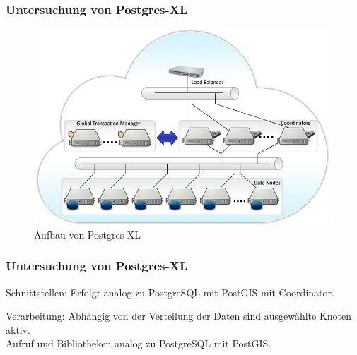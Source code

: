 \documentclass{beamer}
\begin{document}
%
\begin{frame}\frametitle{Untersuchung von Postgres-XL}

\begin{figure}
\centering
\includegraphics[width=1\hsize]{../Abbildungen/postgresxl-structure.jpg}
\caption{Aufbau von Postgres-XL}
\end{figure}
\end{frame}

\begin{frame}\frametitle{Untersuchung von Postgres-XL}
\begin{block}{Schnittstellen:}
Erfolgt analog zu PostgreSQL mit PostGIS mit Coordinator.
\end{block}

\vspace{\baselineskip}
\vspace{\baselineskip}

\begin{block}{Verarbeitung:}
Abhängig von der Verteilung der Daten sind ausgewählte Knoten aktiv.\\
Aufruf und Bibliotheken analog zu PostgreSQL mit PostGIS.
\end{block}

\end{frame}
\end{document}
